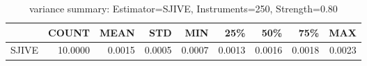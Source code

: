 \begin{table}[ht]
\centering
\caption{variance summary: Estimator=SJIVE, Instruments=250, Strength=0.80}
\begin{tabular}{lrrrrrrrr}
\toprule
 & COUNT & MEAN & STD & MIN & 25\% & 50\% & 75\% & MAX \\
\midrule
SJIVE & 10.0000 & 0.0015 & 0.0005 & 0.0007 & 0.0013 & 0.0016 & 0.0018 & 0.0023 \\
\bottomrule
\end{tabular}
\end{table}
